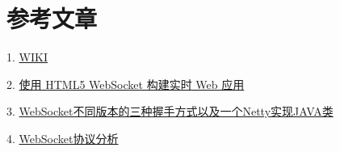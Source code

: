 \section {\ZHH 参考文章} {
    {1. \href{http://zh.wikipedia.org/wiki/WebSocket}{WIKI}}\par
    {2. \href{http://www.ibm.com/developerworks/cn/web/1112_huangxa_websocket/}{使用 HTML5 WebSocket 构建实时 Web 应用}}\par
    {3. \href{http://blog.csdn.net/fenglibing/article/details/7100070}{WebSocket不同版本的三种握手方式以及一个Netty实现JAVA类}}\par
    {4. \href{http://www.cnblogs.com/caosiyang/archive/2012/08/14/2637721.html}{WebSocket协议分析}}\par
}



